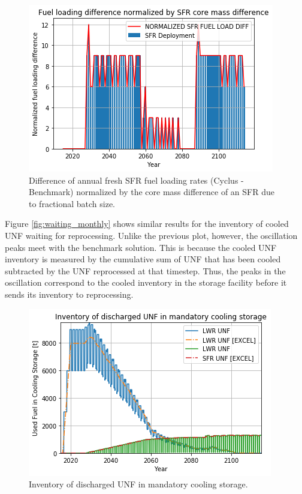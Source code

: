 \begin{figure}[htbp!]
    \begin{center}
        \includegraphics[scale=0.5]{./images/results_18/fuel_load_diff_norm.png}
    \end{center}
        \caption{Difference of annual fresh \gls{SFR} fuel loading rates (Cyclus - Benchmark) normalized by the core mass difference of an \gls{SFR} due to fractional batch size.}
    \label{fig:fuel_load_diff_norm}
\end{figure}


Figure \ref{fig:waiting_monthly} shows similar results for the inventory of cooled
\gls{UNF} waiting for reprocessing.
Unlike the previous plot, however, the oscillation peaks meet with the benchmark
solution.  This is because the cooled \gls{UNF} inventory is measured by the cumulative sum
of \gls{UNF} that has been cooled subtracted by the \gls{UNF} reprocessed at that timestep.
Thus, the peaks in the oscillation correspond to the cooled inventory in the storage
facility before it sends its inventory to reprocessing.

\begin{figure}[htbp!]
    \begin{center}
        \includegraphics[scale=0.5]{./images/results_18/fuel_discharge_monthly.png}
    \end{center}
        \caption{Inventory of discharged \gls{UNF} in mandatory cooling storage.}
    \label{fig:fuel_discharge_monthly}
\end{figure}


